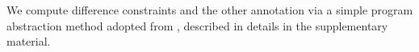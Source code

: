 We compute difference constraints and the other annotation via a
simple program abstraction method adopted
from \cite{sinn2017complexity}, described in details in the
supplementary material.

